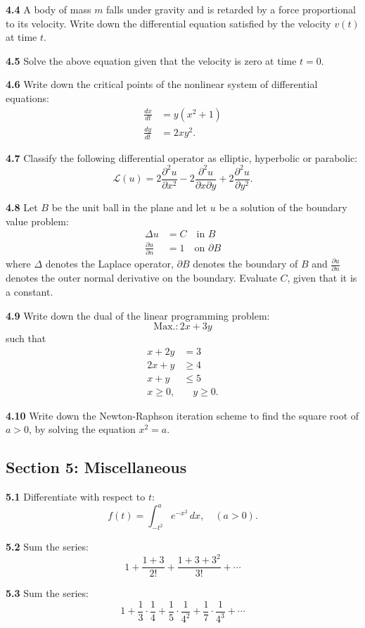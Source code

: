 \documentclass[11pt,a4paper]{article}
\newcommand{\examsec}[1]{%
  \subsection*{#1}
  \vspace{-2pt}
}
\newcommand{\qitem}[1]{\par\medskip\noindent\textbf{#1}\hspace{0.5em}}
\begin{document}
\qitem{4.4} A body of mass $m$ falls under gravity and is retarded by a force proportional to its velocity. Write down the differential equation satisfied by the velocity $v(t)$ at time $t$.

\qitem{4.5} Solve the above equation given that the velocity is zero at time $t = 0$.

\qitem{4.6} Write down the critical points of the nonlinear system of differential equations:
\begin{align*}
  \frac{dx}{dt} &= y(x^2 + 1) \\
  \frac{dy}{dt} &= 2xy^2.
\end{align*}

\qitem{4.7} Classify the following differential operator as elliptic, hyperbolic or parabolic:
\[
  \mathcal{L}(u) = 2\frac{\partial^2 u}{\partial x^2} - 2\frac{\partial^2 u}{\partial x \partial y} + 2\frac{\partial^2 u}{\partial y^2}.
\]

\qitem{4.8} Let $B$ be the unit ball in the plane and let $u$ be a solution of the boundary value problem:
\begin{align*}
  \Delta u &= C \quad \text{in } B \\
  \frac{\partial u}{\partial n} &= 1 \quad \text{on } \partial B
\end{align*}
where $\Delta$ denotes the Laplace operator, $\partial B$ denotes the boundary of $B$ and $\frac{\partial u}{\partial n}$ denotes the outer normal derivative on the boundary. Evaluate $C$, given that it is a constant.

\qitem{4.9} Write down the dual of the linear programming problem:
\[
  \text{Max.}: 2x + 3y
\]
such that
\begin{align*}
  x + 2y &= 3 \\
  2x + y &\ge 4 \\
  x + y &\le 5 \\
  x \ge 0,&\quad y \ge 0.
\end{align*}

\qitem{4.10} Write down the Newton-Raphson iteration scheme to find the square root of $a > 0$, by solving the equation $x^2 = a$.

\examsec{Section 5: Miscellaneous}

\qitem{5.1} Differentiate with respect to $t$:
\[
  f(t) = \int_{-t^2}^{a} e^{-x^2}\,dx,\quad (a > 0).
\]

\qitem{5.2} Sum the series:
\[
  1 + \frac{1 + 3}{2!} + \frac{1 + 3 + 3^2}{3!} + \cdots
\]

\qitem{5.3} Sum the series:
\[
  1 + \frac{1}{3}\cdot\frac{1}{4} + \frac{1}{5}\cdot\frac{1}{4^2} + \frac{1}{7}\cdot\frac{1}{4^3} + \cdots
\]
\end{document}
